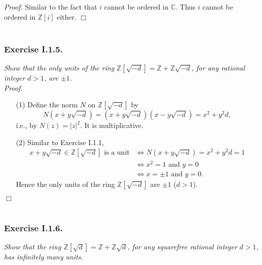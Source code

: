 \documentclass{article}
\begin{document}
\emph{Proof.}
  Similar to the fact that $i$ cannot be ordered in $\mathbb{C}$.
  Thus $i$ cannot be ordered in $\mathbb{Z}[i]$ either.
$\Box$ \\\\






\subsubsection*{Exercise I.1.5.}
\emph{Show that the only units of the ring $\mathbb{Z}[\sqrt{-d}] = \mathbb{Z} + \mathbb{Z}\sqrt{-d}$,
for any rational integer $d > 1$, are $\pm 1$.} \\



\emph{Proof.}
\begin{enumerate}
\item[(1)]
  Define the norm $N$ on $\mathbb{Z}[\sqrt{-d}]$ by
  \[
    N(x+y\sqrt{-d}) = (x+y\sqrt{-d})(x-y\sqrt{-d}) = x^2 + y^2 d,
  \]
  i.e., by $N(z) = |z|^2$.
  It is multiplicative.

\item[(2)]
  Similar to Exercise I.1.1,
  \begin{align*}
    \text{$x+y\sqrt{-d} \in \mathbb{Z}[\sqrt{-d}]$ is a unit}
    &\Longleftrightarrow
    N(x+y\sqrt{-d}) = x^2 + y^2 d = 1 \\
    &\Longleftrightarrow
    x^2 = 1 \text{ and } y = 0 \\
    &\Longleftrightarrow
    x = \pm 1 \text{ and } y = 0.
  \end{align*}
  Hence the only units of the ring $\mathbb{Z}[\sqrt{-d}]$ are $\pm 1$ ($d > 1$).
\end{enumerate}
$\Box$ \\\\






\subsubsection*{Exercise I.1.6.}
\emph{Show that the ring $\mathbb{Z}[\sqrt{d}] = \mathbb{Z} + \mathbb{Z}\sqrt{d}$,
for any squarefree rational integer $d > 1$, has infinitely many units.} \\
\end{document}
